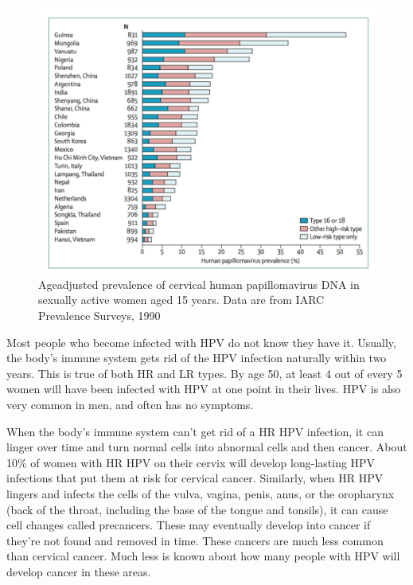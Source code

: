 \begin{figure}[ht]
	\centering
	\includegraphics[scale=0.7]{IMG/prevalence.png}
	\caption{Age\-adjusted prevalence of cervical human papillomavirus DNA in sexually active women aged 15 years. Data are from IARC Prevalence Surveys, 1990}
	\label{zurHausen}
\end{figure} 


Most people who become infected with HPV do not know they have it. Usually, the body's immune system gets rid of the HPV infection naturally within two years. This is true of both HR and LR types. By age 50, at least 4 out of every 5 women will have been infected with HPV at one point in their lives. HPV is also very common in men, and often has no symptoms.

When the body's immune system can't get rid of a HR HPV infection, it can linger over time and turn normal cells into abnormal cells and then cancer. About 10\% of women with HR HPV on their cervix will develop long-lasting HPV infections that put them at risk for cervical cancer. Similarly, when HR HPV lingers and infects the cells of the vulva, vagina, penis, anus, or the oropharynx (back of the throat, including the base of the tongue and tonsils), it can cause cell changes called precancers. These may eventually develop into cancer if they're not found and removed in time. These cancers are much less common than cervical cancer. Much less is known about how many people with HPV will develop cancer in these areas.

